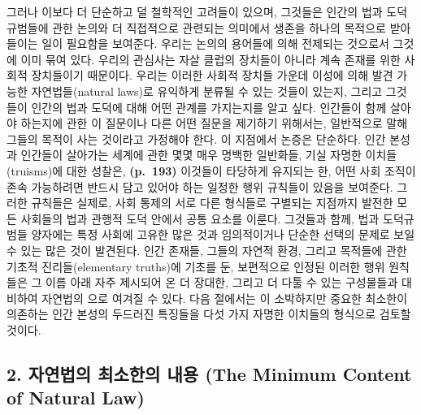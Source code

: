 그러나 이보다 더 단순하고 덜 철학적인 고려들이 있으며, 그것들은 인간의
법과 도덕규범들에 관한 논의와 더 직접적으로 관련되는 의미에서 생존을
하나의 목적으로 받아들이는 일이 필요함을 보여준다. 우리는 논의의
용어들에 의해 전제되는 것으로서 그것에 이미 묶여 있다. 우리의 관심사는
자살 클럽의 장치들이 아니라 계속 존재를 위한 사회적 장치들이기 때문이다.
우리는 이러한 사회적 장치들 가운데 이성에 의해 발견 가능한
자연법들(natural laws)로 유익하게 분류될 수 있는 것들이 있는지, 그리고
그것들이 인간의 법과 도덕에 대해 어떤 관계를 가지는지를 알고 싶다.
인간들이  함께 살아야 하는지에 관한 이 질문이나 다른 어떤
질문을 제기하기 위해서는, 일반적으로 말해 그들의 목적이 사는 것이라고
가정해야 한다. 이 지점에서 논증은 단순하다. 인간 본성과 인간들이
살아가는 세계에 관한 몇몇 매우 명백한 일반화들, 기실 자명한
이치들(truisms)에 대한 성찰은, \textbf{(p.~193)} 이것들이 타당하게
유지되는 한, 어떤 사회 조직이 존속 가능하려면 반드시 담고 있어야 하는
일정한 행위 규칙들이 있음을 보여준다. 그러한 규칙들은 실제로, 사회
통제의 서로 다른 형식들로 구별되는 지점까지 발전한 모든 사회들의 법과
관행적 도덕 안에서 공통 요소를 이룬다. 그것들과 함께, 법과 도덕규범들
양자에는 특정 사회에 고유한 많은 것과 임의적이거나 단순한 선택의 문제로
보일 수 있는 많은 것이 발견된다. 인간 존재들, 그들의 자연적 환경, 그리고
목적들에 관한 기초적 진리들(elementary truths)에 기초를 둔, 보편적으로
인정된 이러한 행위 원칙들은 그 이름 아래 자주 제시되어 온 더 장대한,
그리고 더 다툴 수 있는 구성물들과 대비하여 자연법의 으로 여겨질 수 있다. 다음 절에서는 이 소박하지만
중요한 최소한이 의존하는 인간 본성의 두드러진 특징들을 다섯 가지 자명한
이치들의 형식으로 검토할 것이다.

\subsection{2. 자연법의 최소한의 내용 (The Minimum Content of Natural
Law)}\label{uxc790uxc5f0uxbc95uxc758-uxcd5cuxc18cuxd55cuxc758-uxb0b4uxc6a9-the-minimum-content-of-natural-law}

